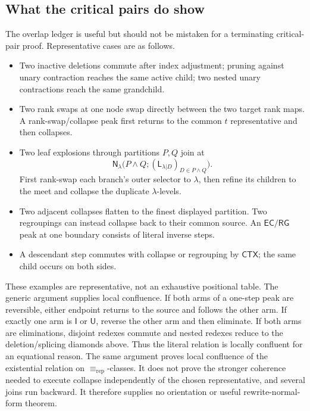 \subsection{What the critical pairs do show}

The overlap ledger is useful but should not be mistaken for a terminating
critical-pair proof.  Representative cases are as follows.

\begin{itemize}
\item Two inactive deletions commute after index adjustment; pruning against
      unary contraction reaches the same active child; two nested unary
      contractions reach the same grandchild.
\item Two rank swaps at one node swap directly between the two target rank
      maps.  A rank-swap/collapse peak first returns to the common \(t\)
      representative and then collapses.
\item Two leaf explosions through partitions \(P,Q\) join at
      \begin{equation}
       \mathsf N_\lambda\bigl(P\wedge Q;
          (\mathsf L_{\lambda|D})_{D\in P\wedge Q}\bigr).
       \label{eq:rewrite-leaf-meet-join}
      \end{equation}
      First rank-swap each branch's outer selector to \(\lambda\), then refine
      its children to the meet and collapse the duplicate
      \(\lambda\)-levels.
\item Two adjacent collapses flatten to the finest displayed partition.  Two
      regroupings can instead collapse back to their common source.  An
      \(\mathsf{EC/RG}\) peak at one boundary consists of literal inverse
      steps.
\item A descendant step commutes with collapse or regrouping by
      \(\mathsf{CTX}\); the same child occurs on both sides.
\end{itemize}

These examples are representative, not an exhaustive positional table.  The
generic argument supplies local confluence.  If both arms of a one-step peak
are reversible, either endpoint returns to the source and follows the other
arm.  If exactly one arm is \(\mathsf I\) or \(\mathsf U\), reverse the other
arm and then eliminate.  If both arms are eliminations, disjoint redexes
commute and nested redexes reduce to the deletion/splicing diamonds above.
Thus the literal relation is locally confluent for an equational reason.  The
same argument proves local confluence of the existential relation on
\(\equiv_{\mathrm{rep}}\)-classes.  It does not prove the stronger coherence
needed to execute collapse independently of the chosen representative, and
several joins run backward.  It therefore supplies no orientation or useful
rewrite-normal-form theorem.

